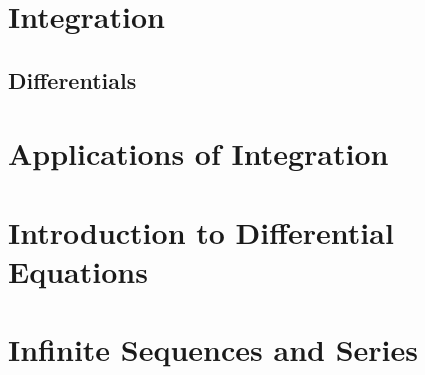 \documentclass{article}
\begin{document}
    \pagebreak

    \section{Integration}

        \subsection{Differentials}

    \section{Applications of Integration}
    \section{Introduction to Differential Equations}
    \section{Infinite Sequences and Series}
\end{document}

